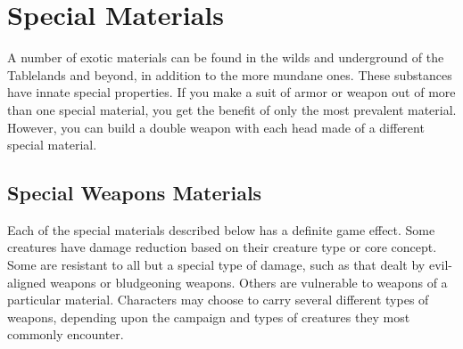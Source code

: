\section{Special Materials}
A number of exotic materials can be found in the wilds and underground of the Tablelands and beyond, in addition to the more mundane ones. These substances have innate special properties. If you make a suit of armor or weapon out of more than one special material, you get the benefit of only the most prevalent material. However, you can build a double weapon with each head made of a different special material.

\subsection{Special Weapons Materials}
Each of the special materials described below has a definite game effect. Some creatures have damage reduction based on their creature type or core concept. Some are resistant to all but a special type of damage, such as that dealt by evil-aligned weapons or bludgeoning weapons. Others are vulnerable to weapons of a particular material. Characters may choose to carry several different types of weapons, depending upon the campaign and types of creatures they most commonly encounter.


